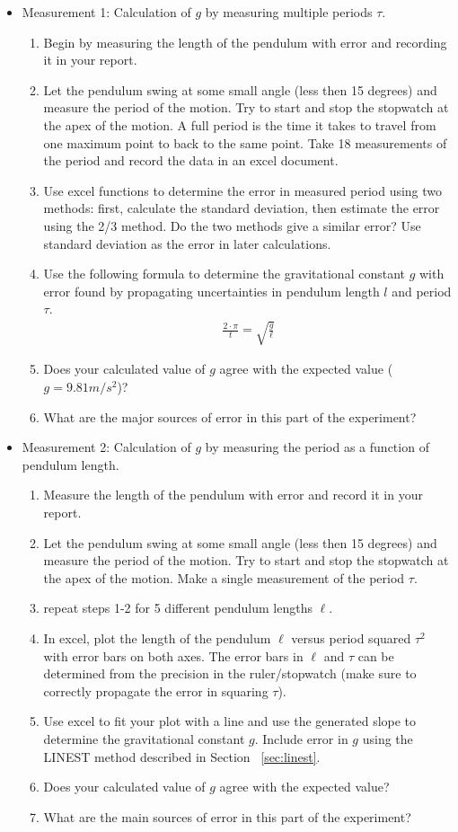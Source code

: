 \begin{itemize}
\item Measurement 1: Calculation of $g$ by measuring multiple periods $\tau$.
\begin{enumerate}
\item Begin by measuring the length of the pendulum with error and recording it in your report.
\item Let the pendulum swing at some small angle (less then 15 degrees) and measure the period of the motion. Try to start and stop the stopwatch at the apex of the motion. A full period is the time it takes to travel from one maximum point to back to the same point. Take 18 measurements of the period and record the data in an excel document.
\item Use excel functions to determine the error in measured period using two methods: first, calculate the standard deviation, then estimate the error using the 2/3 method. Do the two methods give a similar error? Use standard deviation as the error in later calculations.
\item Use the following formula to determine the gravitational constant $g$ with error found by propagating uncertainties in pendulum length $l$ and period $\tau$.
\begin{gather}
 \frac{2\cdot \pi}{t} = \sqrt{\frac{g}{\ell}}
\end{gather}
\item Does your calculated value of $g$ agree with the expected value ($g=9.81 m/s^2$)?
\item What are the major sources of error in this part of the experiment?
\end{enumerate}
\item Measurement 2: Calculation of $g$ by measuring the period as a function of pendulum length.
\begin{enumerate}
\item Measure the length of the pendulum with error and record it in your report.
\item Let the pendulum swing at some small angle (less then 15 degrees) and measure the period of the motion. Try to start and stop the stopwatch at the apex of the motion. Make a single measurement of the period $\tau$.
\item repeat steps 1-2 for 5 different pendulum lengths $\ell$.
\item In excel, plot the length of the pendulum $\ell$ versus period squared $\tau^2$ with error bars on both axes. The error bars in $\ell$ and $\tau$ can be determined from the precision in the ruler/stopwatch (make sure to correctly propagate the error in squaring $\tau$).
\item Use excel to fit your plot with a line and use the generated slope to determine the gravitational constant $g$. Include error in $g$ using the LINEST method described in Section ~\ref{sec:linest}.
\item Does your calculated value of $g$ agree with the expected value?
\item What are the main sources of error in this part of the experiment?
\end{enumerate}
\end{itemize}


